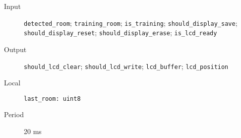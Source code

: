 \begin{flushleft}
  \begin{description}
    \item [Input]
      \verb#detected_room#;
      \verb#training_room#;
      \verb#is_training#;
      \verb#should_display_save#;
      \verb#should_display_reset#;
      \verb#should_display_erase#;
      \verb#is_lcd_ready#
    \item [Output]
      \verb#should_lcd_clear#;
      \verb#should_lcd_write#;
      \verb#lcd_buffer#;
      \verb#lcd_position#
    \item [Local]
      \verb#last_room: uint8#
    \item [Period] 20 ms
  \end{description}
\end{flushleft}

